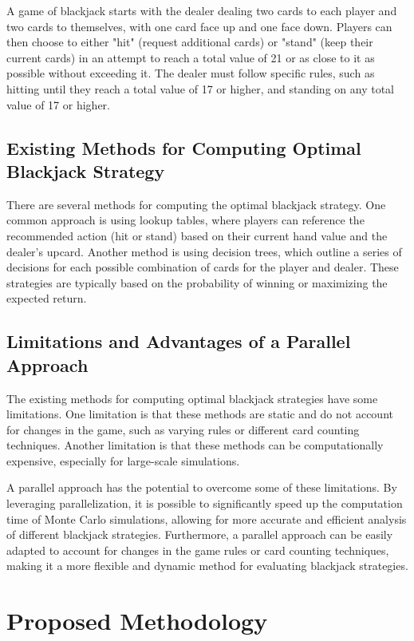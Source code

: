 \documentclass[12pt]{article}
\begin{document}
A game of blackjack starts with the dealer dealing two cards to each player and two cards to themselves, with one card face up and one face down. Players can then choose to either "hit" (request additional cards) or "stand" (keep their current cards) in an attempt to reach a total value of 21 or as close to it as possible without exceeding it. The dealer must follow specific rules, such as hitting until they reach a total value of 17 or higher, and standing on any total value of 17 or higher.
\newline
\subsection{Existing Methods for Computing Optimal Blackjack Strategy}
There are several methods for computing the optimal blackjack strategy. One common approach is using lookup tables, where players can reference the recommended action (hit or stand) based on their current hand value and the dealer's upcard. Another method is using decision trees, which outline a series of decisions for each possible combination of cards for the player and dealer. These strategies are typically based on the probability of winning or maximizing the expected return.

\subsection{Limitations and Advantages of a Parallel Approach}
The existing methods for computing optimal blackjack strategies have some limitations. One limitation is that these methods are static and do not account for changes in the game, such as varying rules or different card counting techniques. Another limitation is that these methods can be computationally expensive, especially for large-scale simulations.

A parallel approach has the potential to overcome some of these limitations. By leveraging parallelization, it is possible to significantly speed up the computation time of Monte Carlo simulations, allowing for more accurate and efficient analysis of different blackjack strategies. Furthermore, a parallel approach can be easily adapted to account for changes in the game rules or card counting techniques, making it a more flexible and dynamic method for evaluating blackjack strategies.

\newpage
\section{Proposed Methodology}
\end{document}
